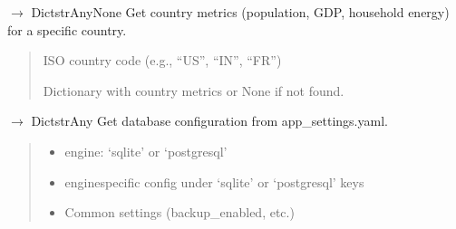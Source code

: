 \documentclass[letterpaper,10pt,english]{sphinxmanual}
\begin{document}
\begin{fulllineitems}
\begin{fulllineitems}
\label{\detokenize{core.config_loader:core.config_loader.ConfigLoader.get_country_metrics}}
\pysigstartsignatures
\pysiglinewithargsret
{}
{}
{{ $\rightarrow$ Dict\DUrole{p}{{[}}strAny\DUrole{p}{{]}}None}}
\pysigstopsignatures
\sphinxAtStartPar
Get country metrics (population, GDP, household energy) for a specific country.
\begin{quote}\begin{description}
\sphinxAtStartPar
{} \textendash{} ISO country code (e.g., “US”, “IN”, “FR”)

\sphinxAtStartPar
Dictionary with country metrics or None if not found.

\end{description}\end{quote}

\end{fulllineitems}


\begin{fulllineitems}
\label{\detokenize{core.config_loader:core.config_loader.ConfigLoader.get_db_config}}
\pysigstartsignatures
\pysiglinewithargsret
{}
{}
{{ $\rightarrow$ Dict\DUrole{p}{{[}}strAny\DUrole{p}{{]}}}}
\pysigstopsignatures
\sphinxAtStartPar
Get database configuration from app\_settings.yaml.
\begin{quote}\begin{description}
\sphinxAtStartPar
\begin{itemize}
\item {} 
\sphinxAtStartPar
engine: ‘sqlite’ or ‘postgresql’

\item {} 
\sphinxAtStartPar
engine\sphinxhyphen{}specific config under ‘sqlite’ or ‘postgresql’ keys

\item {} 
\sphinxAtStartPar
Common settings (backup\_enabled, etc.)


\end{itemize}
\end{description}
\end{quote}
\end{fulllineitems}
\end{fulllineitems}
\end{document}
